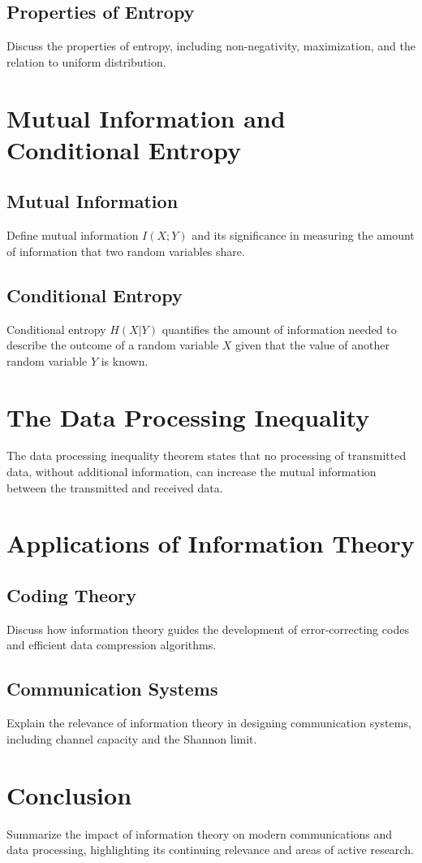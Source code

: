 \documentclass[12pt]{article}
\begin{document}
\subsection{Properties of Entropy}
Discuss the properties of entropy, including non-negativity, maximization, and the relation to uniform distribution.

\section{Mutual Information and Conditional Entropy}
\subsection{Mutual Information}
Define mutual information \(I(X;Y)\) and its significance in measuring the amount of information that two random variables share.

\subsection{Conditional Entropy}
Conditional entropy \(H(X|Y)\) quantifies the amount of information needed to describe the outcome of a random variable \(X\) given that the value of another random variable \(Y\) is known.

\section{The Data Processing Inequality}
The data processing inequality theorem states that no processing of transmitted data, without additional information, can increase the mutual information between the transmitted and received data.

\section{Applications of Information Theory}
\subsection{Coding Theory}
Discuss how information theory guides the development of error-correcting codes and efficient data compression algorithms.

\subsection{Communication Systems}
Explain the relevance of information theory in designing communication systems, including channel capacity and the Shannon limit.

\section{Conclusion}
Summarize the impact of information theory on modern communications and data processing, highlighting its continuing relevance and areas of active research.
\end{document}
